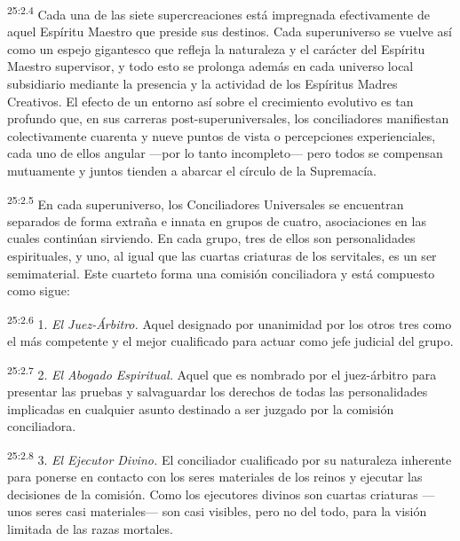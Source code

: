 \par
\textsuperscript{25:2.4} Cada una de las siete supercreaciones está impregnada efectivamente de aquel Espíritu Maestro que preside sus destinos. Cada superuniverso se vuelve así como un espejo gigantesco que refleja la naturaleza y el carácter del Espíritu Maestro supervisor, y todo esto se prolonga además en cada universo local subsidiario mediante la presencia y la actividad de los Espíritus Madres Creativos. El efecto de un entorno así sobre el crecimiento evolutivo es tan profundo que, en sus carreras post-superuniversales, los conciliadores manifiestan colectivamente cuarenta y nueve puntos de vista o percepciones experienciales, cada uno de ellos angular ---por lo tanto incompleto--- pero todos se compensan mutuamente y juntos tienden a abarcar el círculo de la Supremacía.

\par
\textsuperscript{25:2.5} En cada superuniverso, los Conciliadores Universales se encuentran separados de forma extraña e innata en grupos de cuatro, asociaciones en las cuales continúan sirviendo. En cada grupo, tres de ellos son personalidades espirituales, y uno, al igual que las cuartas criaturas de los servitales, es un ser semimaterial. Este cuarteto forma una comisión conciliadora y está compuesto como sigue:

\par
\textsuperscript{25:2.6} 1. \textit{El Juez-Árbitro.} Aquel designado por unanimidad por los otros tres como el más competente y el mejor cualificado para actuar como jefe judicial del grupo.

\par
\textsuperscript{25:2.7} 2. \textit{El Abogado Espiritual.} Aquel que es nombrado por el juez-árbitro para presentar las pruebas y salvaguardar los derechos de todas las personalidades implicadas en cualquier asunto destinado a ser juzgado por la comisión conciliadora.

\par
\textsuperscript{25:2.8} 3. \textit{El Ejecutor Divino.} El conciliador cualificado por su naturaleza inherente para ponerse en contacto con los seres materiales de los reinos y ejecutar las decisiones de la comisión. Como los ejecutores divinos son cuartas criaturas ---unos seres casi materiales--- son casi visibles, pero no del todo, para la visión limitada de las razas mortales.


